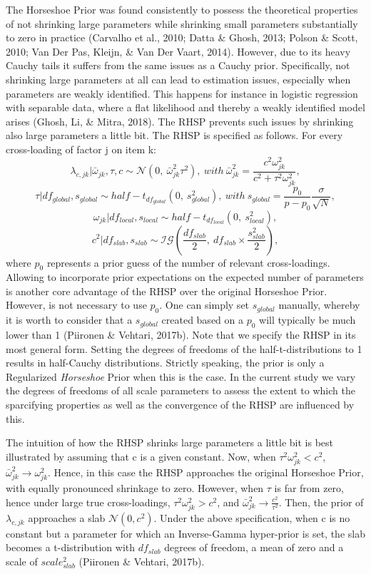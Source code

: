 \documentclass[
  man, donotrepeattitle,floatsintext]{apa6}
\begin{document}
The Horseshoe Prior was found consistently to possess the theoretical properties of not shrinking large parameters while shrinking small parameters substantially to zero in practice (Carvalho et al., 2010; Datta \& Ghosh, 2013; Polson \& Scott, 2010; Van Der Pas, Kleijn, \& Van Der Vaart, 2014). However, due to its heavy Cauchy tails it suffers from the same issues as a Cauchy prior. Specifically, not shrinking large parameters at all can lead to estimation issues, especially when parameters are weakly identified. This happens for instance in logistic regression with separable data, where a flat likelihood and thereby a weakly identified model arises (Ghosh, Li, \& Mitra, 2018). The RHSP prevents such issues by shrinking also large parameters a little bit. The RHSP is specified as follows. For every cross-loading of factor j on item k:
\[\lambda_{c,jk} | \bar{\omega}_{jk}, \tau, c\sim \mathcal{N}(0, \ \bar{\omega}^2_{jk} \tau^2), \ with \ \bar{\omega}^2_{jk} = \frac{c^2\omega_{jk}^2}{c^2 + \tau^2 \omega_{jk}^2},\]
\[\tau | df_{global}, s_{global} \sim half-t_{df_{global}}(0,\  s_{global}^2), \ with \  s_{global} = \frac{p_0}{p-p_0}\frac{\sigma}{\sqrt{N}},\]
\[\omega_{jk}| df_{local}, s_{local} \sim half-t_{df_{local}}(0, \ s_{local}^2),\]
\[c^2 | df_{slab}, s_{slab} \sim \mathcal{IG}(\frac{df_{slab}}{2}, \  df_{slab} \times \frac{s_{slab}^2}{2}),\]
where \(p_0\) represents a prior guess of the number of relevant cross-loadings. Allowing to incorporate prior expectations on the expected number of parameters is another core advantage of the RHSP over the original Horseshoe Prior. However, is not necessary to use \(p_0\). One can simply set \(s_{global}\) manually, whereby it is worth to consider that a \(s_{global}\) created based on a \(p_0\) will typically be much lower than 1 (Piironen \& Vehtari, 2017b). Note that we specify the RHSP in its most general form. Setting the degrees of freedoms of the half-t-distributions to 1 results in half-Cauchy distributions. Strictly speaking, the prior is only a Regularized \emph{Horseshoe} Prior when this is the case. In the current study we vary the degrees of freedoms of all scale parameters to assess the extent to which the sparcifying properties as well as the convergence of the RHSP are influenced by this.

The intuition of how the RHSP shrinks large parameters a little bit is best illustrated by assuming that c is a given constant. Now, when \(\tau^2 \omega^2_{jk} < c^2\), \(\bar{\omega}^2_{jk} \to \omega^2_{jk}\). Hence, in this case the RHSP approaches the original Horseshoe Prior, with equally pronounced shrinkage to zero. However, when \(\tau\) is far from zero, hence under large true cross-loadings, \(\tau^2 \omega^2_{jk} > c^2\), and \(\bar{\omega}^2_{jk} \to \frac{c^2}{\tau^2}\). Then, the prior of \(\lambda_{c,jk}\) approaches a slab \(\mathcal{N}(0, c^2)\). Under the above specification, when c is no constant but a parameter for which an Inverse-Gamma hyper-prior is set, the slab becomes a t-distribution with \(df_{slab}\) degrees of freedom, a mean of zero and a scale of \(scale_{slab}^2\) (Piironen \& Vehtari, 2017b).
\end{document}
